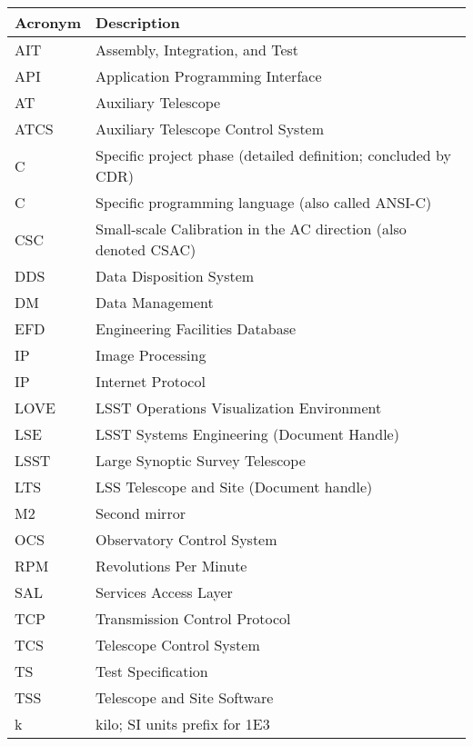 \addtocounter{table}{-1}
\begin{longtable}{|l|p{}|}\hline
\textbf{Acronym} & \textbf{Description}  \\\hline

AIT & Assembly, Integration, and Test \\\hline
API & Application Programming Interface \\\hline
AT & Auxiliary Telescope \\\hline
ATCS & Auxiliary Telescope Control System \\\hline
C & Specific project phase (detailed definition; concluded by CDR) \\\hline
C & Specific programming language (also called ANSI-C) \\\hline
CSC & Small-scale Calibration in the AC direction (also denoted CSAC) \\\hline
DDS & Data Disposition System \\\hline
DM & Data Management \\\hline
EFD & Engineering Facilities Database \\\hline
IP & Image Processing \\\hline
IP & Internet Protocol \\\hline
LOVE & LSST Operations Visualization Environment \\\hline
LSE & LSST Systems Engineering (Document Handle) \\\hline
LSST & Large Synoptic Survey Telescope \\\hline
LTS & LSS Telescope and Site (Document handle) \\\hline
M2 & Second mirror \\\hline
OCS & Observatory Control System \\\hline
RPM & Revolutions Per Minute \\\hline
SAL & Services Access Layer \\\hline
TCP & Transmission Control Protocol \\\hline
TCS & Telescope Control System \\\hline
TS & Test Specification \\\hline
TSS & Telescope and Site Software \\\hline
k & kilo; SI units prefix for 1E3 \\\hline
\end{longtable}
